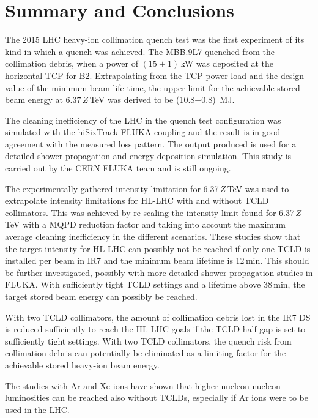 \newpage
\section{Summary and Conclusions}


The 2015 LHC heavy-ion collimation quench test was the first experiment of its kind in which a quench was achieved. The MBB.9L7 quenched from the collimation debris, when a power of $(15\pm 1)\,$kW was deposited at the horizontal TCP for B2. Extrapolating from the TCP power load and the design value of the minimum beam life time, the upper limit for the achievable stored beam energy at $6.37\,Z\,$TeV was derived to be (10.8$\pm$0.8)~MJ. 
\vspace{0.1cm}

The cleaning inefficiency of the LHC in the quench test configuration was simulated with the hiSixTrack-FLUKA coupling and the result is in good agreement with the measured loss pattern. The output produced is used for a detailed shower propagation and energy deposition simulation. This study is carried out by the CERN FLUKA team and is still ongoing. 
\vspace{0.1cm}

The experimentally gathered intensity limitation for 6.37$\,Z\,$TeV was used to extrapolate intensity limitations for HL-LHC with and without TCLD collimators. This was achieved by re-scaling the intensity limit found for 6.37$\,Z\,$TeV with a MQPD reduction factor and taking into account the maximum average cleaning inefficiency in the different scenarios. These studies show that the target intensity for HL-LHC can possibly not be reached if only one TCLD is installed per beam in IR7 and the minimum beam lifetime is 12$\,$min. This should be further investigated, possibly with more detailed shower propagation studies in FLUKA. With sufficiently tight TCLD settings and a lifetime above 38\,min, the target stored beam energy can possibly be reached.
\vspace{0.1cm}

With two TCLD collimators, the amount of collimation debris lost in the IR7 DS is reduced sufficiently to reach the HL-LHC goals if the TCLD half gap is set to sufficiently tight settings. With two TCLD collimators, the quench risk from collimation debris can potentially be eliminated as a limiting factor for the achievable stored heavy-ion beam energy. 
\vspace{0.2cm}

The studies with Ar and Xe ions have shown that higher nucleon-nucleon luminosities can be reached also without TCLDs, especially if Ar ions were to be used in the LHC. 
\vspace{0.2cm} 

